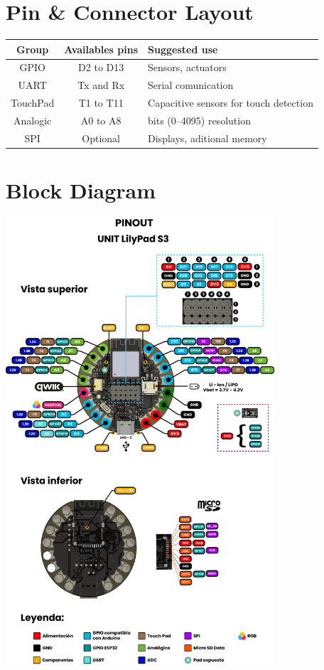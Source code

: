 \documentclass[10pt]{article}
\begin{document}
\section*{Pin \& Connector Layout}
\begin{tabularx}{\textwidth}{|c|c|>{\RaggedRight\arraybackslash}X|}
\hline
\rowcolor{headergray}
Group & Availables pins & Suggested use \\
\hline
GPIO & D2 to D13 & Sensors, actuators \\
UART & Tx and Rx & Serial comunication \\
TouchPad & T1 to T11 & Capacitive sensors for touch detection \\
Analogic & A0 to A8 & 12 bits (0–4095) resolution \\
SPI & Optional & Displays, aditional memory \\
\hline
\end{tabularx}


\FloatBarrier
\newpage
\vspace*{3em}
\section*{Block Diagram}
\vspace{1em}
\begin{center}
\includegraphics[width=0.75\textwidth,keepaspectratio]{images/function-diagram.jpg}
\end{center}
\newpage
\vspace*{3em}
\end{document}
